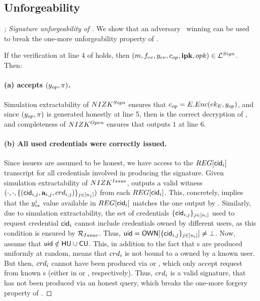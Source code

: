 
\subsection{Unforgeability}

\begin{proof}[; Signature unforgeability of \CUASGen]
  We show that an adversary \adv~winning \ExpForge can be used to break the
  one-more unforgeability property of \SBCM.
 
  If the verification at line 4 of \ExpForge holds, then $(m,f_{ev},
  y_{ev},c_{op},\mathbf{ipk},opk) \in \mathcal{L}^{Sign}$. Then:

  \paragraph{(a) \Judge accepts $(y_{op},\pi)$.} %
  Simulation extractability of $NIZK^{Sign}$ ensures that $c_{op} =
  E.Enc(ek_{E},y_{op})$, and since $(y_{op},\pi)$ is generated honestly at
  line 5, then \yinsp is the correct decryption of \cinsp, and completeness of
  $NIZK^{Open}$ ensures that \Judge outputs $1$ at line 6.

  \paragraph{(b) All used credentials were correctly issued.} %
  Since issuers are assumed to be honest, we have access to the $\trans[\cid_i]$
  transcript for all credentials involved in producing the signature. Given
  simulation extractability of $NIZK^{Issue}$, \ExtractIssue outputs a valid
  witness $(\cdot,\cdot,\lbrace(\mathsf{cid}_{i,j},\mathbf{a}_{i,j},crd_{i,j})
  \rbrace_{j\in[n_j]})$ from each $\trans[\cid_i]$. This, concretely, implies
  that the $y_{is}^i$ value available in $\trans[\cid_i]$ matches the one
  output by \fissue. Similarly, due to simulation extractability, the set of
  credentials $\lbrace \mathsf{cid}_{i,j}\rbrace_{j\in[n_i]}$ used to request credential
  $\mathsf{cid}_i$ cannot include credentials owned by different users, as this
  condition is ensured by $\mathcal{R}_{Issue}$. Thus, $\mathsf{uid} = \mathsf{OWN}[\lbrace
  \mathsf{cid}_{i,j} \rbrace_{j\in[n_i]}] \neq \bot$. Now, assume that $\mathsf{uid} \notin \mathsf{HU}
  \cup \mathsf{CU}$. This, in addition to the fact that {\usk}s are produced uniformly
  at random, means that $crd_i$ is not bound to a \usk owned by a known
  user. But then, $crd_i$ cannot have been produced via \OBTISS or \ISSUE,
  which only accept request from known {\uid}s (either in \HU or \CU,
  respectively). Thus, $crd_i$ is a valid \SBCM signature, that has not been
  produced via an honest query, which breaks the one-more forgery property of
  \SBCM.


\end{proof}
